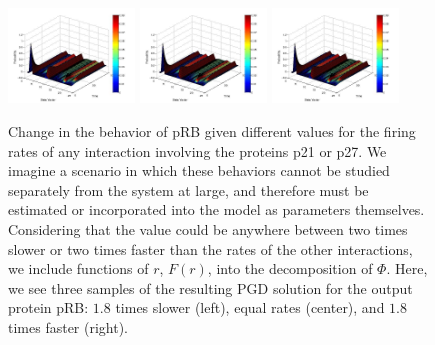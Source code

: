 \documentclass{article}
\begin{document}
\begin{figure}[h!]
\centering
 \includegraphics[width=0.3\textwidth]{pgd_normal.jpg}
  \includegraphics[width=0.3\textwidth]{pgd_normal.jpg}
 \includegraphics[width=0.3\textwidth]{pgd_normal.jpg}
 \caption{Change in the behavior of pRB given different values for the firing rates of any interaction involving the proteins p21 or p27. We imagine a scenario in which these behaviors cannot be studied separately from the system at large, and therefore must be estimated or incorporated into the model as parameters themselves. Considering that the value could be anywhere between two times slower or two times faster than the rates of the other interactions, we include functions of $r$, $F(r)$, into the decomposition of $\Phi$. Here, we see three samples of the resulting PGD solution for the output protein pRB: $1.8$ times slower (left), equal rates (center), and $1.8$ times faster (right).}
  \label{compare_par}

\end{figure} 
\end{document}
